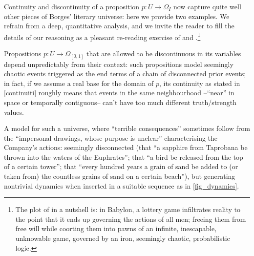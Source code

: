 Continuity and discontinuity of a proposition $p : U \to \Omega_I$ now capture quite well other pieces of Borges' literary universe: here we provide two examples. We refrain from a deep, quantitative analysis, and we invite the reader to fill the details of our reasoning as a pleasant re-reading exercise of \cite{babil} and \cite{tlonEN}.\footnote{The plot of \cite{babil} in a nutshell is: in Babylon, a lottery game infiltrates reality to the point that it ends up governing the actions of all men; freeing them from free will while coorting them into pawns of an infinite, inescapable, unknowable game, governed by an iron, seemingly chaotic, probabilistic logic.}
\begin{example}\label{bli}
  Propositions $p : U \to \Omega_{[0,1]}$ that are allowed to be discontinuous in its variables depend unpredictably from their context: such propositions model seemingly chaotic events triggered as the end terms of a chain of disconnected prior events; in fact, if we assume a real base for the domain of $p$, its continuity as stated in \autoref{continuiti} roughly means that events in the same neighbourhood --``near'' in space or temporally contiguous-- can't have too much different truth/strength values.

  A model for such a universe, where ``terrible consequences'' sometimes follow from the ``impersonal drawings, whose purpose is unclear'' characterising the Company's actions: seemingly disconnected (that ``a sapphire from Taprobana be thrown into the waters of the Euphrates''; that ``a bird be released from the top of a certain tower''; that ``every hundred years a grain of sand be added to (or taken from) the countless grains of sand on a certain beach''), but generating nontrivial dynamics when inserted in a suitable sequence as in \autoref{fig_dynamics}.


\end{example}
